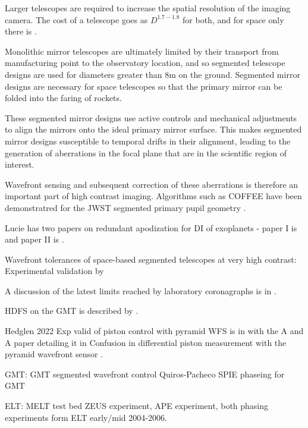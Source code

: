\documentclass[letterpaper]{ar-1col}
\begin{document}
Larger telescopes are required to increase the spatial resolution of the imaging camera. The cost of a telescope goes as $D^{1.7-1.8}$ \citep{Stahl20} for both, and for space only there is \citet{Stahl10}.
 
Monolithic mirror telescopes are ultimately limited by their transport from manufacturing point to the observatory location, and so segmented telescope designs are used for diameters greater than 8m on the ground.
 Segmented mirror designs are necessary for space telescopes so that the primary mirror can be folded into the faring of rockets.

These segmented mirror designs use active controls and mechanical adjustments to align the mirrors onto the ideal primary mirror surface.
%
This makes segmented mirror designs susceptible to temporal drifts in their alignment, leading to the generation of aberrations in the focal plane that are in the scientific region of interest.

Wavefront sensing and subsequent correction of these aberrations is therefore an important part of high contrast imaging.
%
Algorithms such as COFFEE have been demonstratred for the JWST segmented primary pupil geometry \citep{Leboulleux20}.

Lucie has two papers on redundant apodization for DI of exoplanets - paper I is \citep{Leboulleux22} and paper II is \citet{Leboulleux22a}.

Wavefront tolerances of space-based segmented telescopes at very high contrast: Experimental validation by \citet{Laginja22}

A discussion of the latest limits reached by laboratory coronagraphs is in \citet{Mennesson24}.



HDFS on the GMT is described by \citet{Haffert22}.

Hedglen 2022 Exp valid of piston control with pyramid WFS is in \citet{Bertrou-Cantou23} with the A and A paper detailing it in Confusion in differential piston measurement with the pyramid wavefront sensor \citep{Bertrou-Cantou22}.

GMT: GMT segmented wavefront control Quiros-Pacheco SPIE phaseing for GMT \citep{Quiros-Pacheco22}


ELT: MELT test bed ZEUS experiment, APE experiment, both phasing experiments form ELT early/mid 2004-2006.
\end{document}
